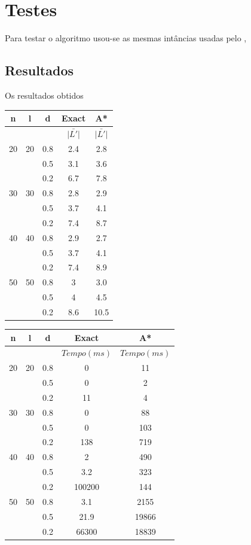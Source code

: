 \documentclass[12pt]{article}
\begin{document}
\section{Testes}\label{sec:testes}
	
	Para testar o algoritmo usou-se as mesmas intâncias usadas pelo \cite{Consoli:2009}, 

	\subsection{Resultados}\label{sec:resultados}
		
		Os resultados obtidos 

		\begin{tabular}{c|c|c|c|c} \hline
			n & l & d & Exact & A* \\ \hline
			& & & $\bar{|L'|}$ & $\bar{|L'|}$ \\ \hline
			20 & 20 & 0.8 & 2.4 & 2.8\\
			 &  & 0.5 & 3.1 & 3.6\\
			 &  & 0.2 & 6.7 & 7.8\\ \hline
			30 & 30 & 0.8 & 2.8 & 2.9 \\
			 &  & 0.5 & 3.7 & 4.1\\
			 &  & 0.2 & 7.4 & 8.7\\ \hline
			40 & 40 & 0.8 & 2.9 & 2.7\\
			 &  & 0.5 & 3.7 & 4.1\\
			 &  & 0.2 & 7.4 & 8.9\\ \hline
			50 & 50 & 0.8 & 3 & 3.0\\
			 &  & 0.5 & 4 & 4.5\\
			 &  & 0.2 & 8.6 & 10.5\\ \hline
		\end{tabular}

		\vspace{2cm}

		\begin{tabular}{c|c|c|c|c} \hline
			n & l & d & Exact & A* \\ \hline
			& & & $Tempo(ms)$ & $Tempo(ms)$\\ \hline
			20 & 20 & 0.8 &  0 & 11\\
			   &    & 0.5 &  0 & 2\\
			   &    & 0.2 & 11 & 4\\ \hline
			30 & 30 & 0.8 &  0 & 88 \\
			   &    & 0.5 &  0 & 103\\
			   &    & 0.2 & 138 & 719\\ \hline
			40 & 40 & 0.8 &  2 & 490\\
			   &    & 0.5 & 3.2 & 323\\
			   &    & 0.2 & 100200 & 144\\ \hline
			50 & 50 & 0.8 & 3.1 & 2155\\
			   &    & 0.5 & 21.9 & 19866\\
			   &    & 0.2 & 66300 & 18839\\ \hline
		\end{tabular}
		
\end{document}
